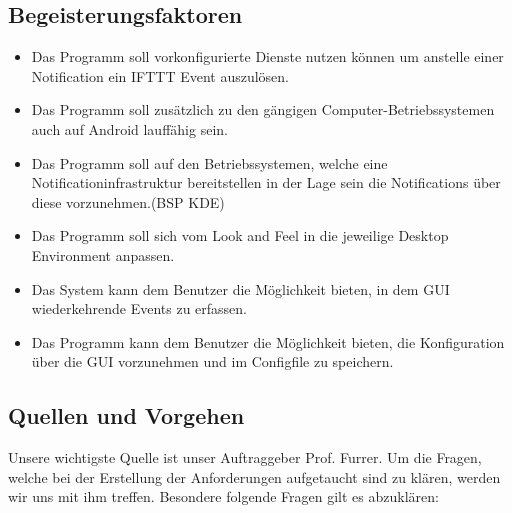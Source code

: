 \documentclass[11pt,titelpage]{scrartcl}
\begin{document}
\subsection{Begeisterungsfaktoren}


\begin{itemize}
\item
Das Programm soll vorkonfigurierte Dienste nutzen können um anstelle einer Notification  ein IFTTT Event auszulösen.

\item
Das Programm soll zusätzlich zu den gängigen Computer-Betriebssystemen auch auf Android lauffähig sein.


\item
Das Programm soll auf den Betriebssystemen, welche eine Notificationinfrastruktur bereitstellen  in der Lage sein die
Notifications über diese vorzunehmen.(BSP KDE)

\item
Das Programm soll sich vom Look and Feel in die jeweilige Desktop Environment anpassen.
\item
Das System kann dem Benutzer die Möglichkeit bieten, in dem GUI wiederkehrende Events zu erfassen.
\item
Das Programm kann dem Benutzer die Möglichkeit bieten, die Konfiguration über die GUI vorzunehmen und im Configfile zu
speichern.

\end{itemize}






\subsection{Quellen und Vorgehen}
Unsere wichtigste Quelle ist unser Auftraggeber Prof. Furrer. Um die Fragen, welche bei der Erstellung der
Anforderungen aufgetaucht sind zu klären, werden wir uns mit ihm treffen. Besondere folgende Fragen gilt es abzuklären:
\end{document}
